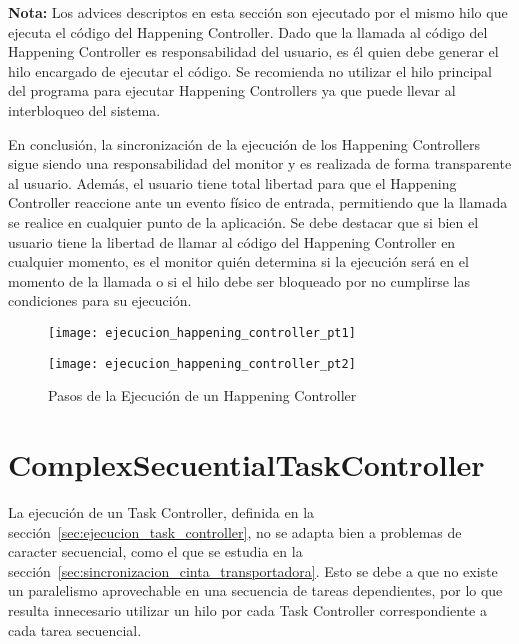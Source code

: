 \begin{framed}
\textbf{Nota:} Los advices descriptos en esta sección son ejecutado por el
mismo hilo que ejecuta el código del Happening Controller. Dado que la llamada
al código del Happening Controller es responsabilidad del usuario, es él quien
debe generar el hilo encargado de ejecutar el código. Se recomienda no utilizar
el hilo principal del programa para ejecutar Happening Controllers ya que puede
llevar al interbloqueo del sistema.
\end{framed}

En conclusión, la sincronización de la ejecución de los Happening Controllers
sigue siendo una responsabilidad del monitor y es realizada de forma
transparente al usuario. Además, el usuario tiene total libertad para que el
Happening Controller reaccione ante un evento físico de entrada, permitiendo
que la llamada se realice en cualquier punto de la aplicación. Se debe destacar
que si bien el usuario tiene la libertad de llamar al código del Happening
Controller en cualquier momento, es el monitor quién determina si la
ejecución será en el momento de la llamada o si el hilo debe ser
bloqueado por no cumplirse las condiciones para su ejecución.

\begin{figure}[H]
	\centering
	\texttt{[image: ejecucion\_happening\_controller\_pt1]}
\end{figure}
\begin{figure}[H]
	\centering
	\texttt{[image: ejecucion\_happening\_controller\_pt2]}
	\caption{Pasos de la Ejecución de un Happening Controller}
	\label{fig:ejecucion_happening_controller}
\end{figure}

\section{ComplexSecuentialTaskController}
\label{sec:complex_secuential_task_controller}
La ejecución de un Task Controller, definida en la
sección~\ref{sec:ejecucion_task_controller}, no se adapta bien a
problemas de caracter secuencial, como el que se estudia en la
sección~\ref{sec:sincronizacion_cinta_transportadora}.
Esto se debe a que no existe un paralelismo aprovechable en una secuencia de
tareas dependientes, por lo que resulta innecesario utilizar un hilo
por cada Task Controller correspondiente a cada tarea secuencial.

